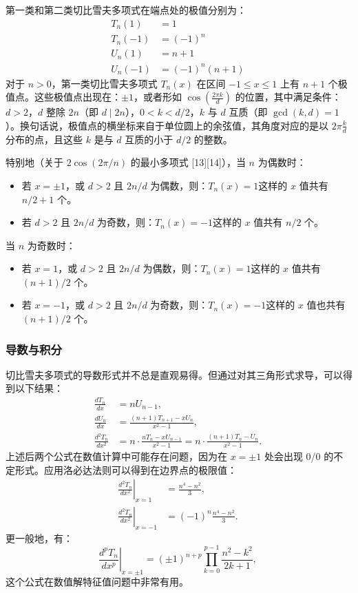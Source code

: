 第一类和第二类切比雪夫多项式在端点处的极值分别为：
$$
\begin{aligned}
T_n(1) &= 1 \\
T_n(-1) &= (-1)^n \\
U_n(1) &= n + 1 \\
U_n(-1) &= (-1)^n(n + 1)
\end{aligned}~
$$
对于 $n > 0$，第一类切比雪夫多项式 $T_n(x)$ 在区间 $-1 \leq x \leq 1$ 上有 $n + 1$ 个极值点。这些极值点出现在：$\pm1$，或者形如 $\cos\left(\frac{2\pi k}{d}\right)$ 的位置，其中满足条件：$d > 2$，$d$ 整除 $2n$（即 $d \mid 2n$），$0 < k < d/2$，$k$ 与 $d$ 互质（即 $\gcd(k, d) = 1$）。换句话说，极值点的横坐标来自于单位圆上的余弦值，其角度对应的是以 $2\pi \frac{k}{d}$ 分布的点，且这些 $k$ 是与 $d$ 互质的小于 $d/2$ 的整数。

特别地（关于 $2\cos\left(2\pi/n\right)$ 的最小多项式 [13][14]），当 $n$ 为偶数时：
\begin{itemize}
\item 若 $x = \pm 1$，或 $d > 2$ 且 $2n/d$ 为偶数，则：$T_n(x) = 1$这样的 $x$ 值共有 $n/2 + 1$ 个。
\item 若 $d > 2$ 且 $2n/d$ 为奇数，则：$T_n(x) = -1$这样的 $x$ 值共有 $n/2$ 个。
\end{itemize}
当 $n$ 为奇数时：
\begin{itemize}
\item 若 $x = 1$，或 $d > 2$ 且 $2n/d$ 为偶数，则：$T_n(x) = 1$这样的 $x$ 值共有 $(n + 1)/2$ 个。
\item 若 $x = -1$，或 $d > 2$ 且 $2n/d$ 为奇数，则：$T_n(x) = -1$这样的 $x$ 值也共有 $(n + 1)/2$ 个。
\end{itemize}
\subsubsection{导数与积分}
切比雪夫多项式的导数形式并不总是直观易得。但通过对其三角形式求导，可以得到以下结果：
$$
\begin{aligned}
\frac{dT_n}{dx} &= n U_{n-1}, \\
\frac{dU_n}{dx} &= \frac{(n+1)T_{n+1} - xU_n}{x^2 - 1}, \\
\frac{d^2 T_n}{dx^2} &= n \cdot \frac{n T_n - x U_{n-1}}{x^2 - 1} = n \cdot \frac{(n + 1)T_n - U_n}{x^2 - 1}.
\end{aligned}~
$$
上述后两个公式在数值计算中可能存在问题，因为在 $x = \pm 1$ 处会出现 0/0 的不定形式。应用洛必达法则可以得到在边界点的极限值：
$$
\begin{aligned}
\left.\frac{d^2 T_n}{dx^2}\right|_{x = 1} &= \frac{n^4 - n^2}{3}, \\
\left.\frac{d^2 T_n}{dx^2}\right|_{x = -1} &= (-1)^n \frac{n^4 - n^2}{3}.
\end{aligned}~
$$
更一般地，有：
$$
\left.\frac{d^p T_n}{dx^p}\right|_{x = \pm 1} = (\pm 1)^{n + p} \prod_{k = 0}^{p - 1} \frac{n^2 - k^2}{2k + 1},~
$$
这个公式在数值解特征值问题中非常有用。

